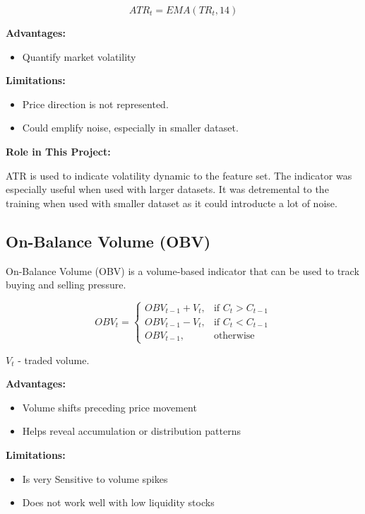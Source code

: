 \begin{equation}
ATR_t = EMA(TR_t, 14)
\end{equation}

\textbf{Advantages:}
\begin{itemize}
    \item Quantify market volatility
\end{itemize}

\textbf{Limitations:}
\begin{itemize}
    \item Price direction is not represented.
    \item Could emplify noise, especially in smaller dataset.
\end{itemize}

\textbf{Role in This Project:}  

ATR is used to indicate volatility dynamic to the feature set. The indicator was especially useful when used with larger datasets. It was detremental to the training when used with smaller dataset as it could introducte a lot of noise.

\subsection{On-Balance Volume (OBV)}

On-Balance Volume (OBV) is a volume-based indicator that can be used to track buying and selling pressure.

\begin{equation}
OBV_t = 
\begin{cases}
OBV_{t-1} + V_t, & \text{if } C_t > C_{t-1} \\
OBV_{t-1} - V_t, & \text{if } C_t < C_{t-1} \\
OBV_{t-1}, & \text{otherwise}
\end{cases}
\end{equation}

$V_t$ - traded volume.

\textbf{Advantages:}
\begin{itemize}
    \item Volume shifts preceding price movement
    \item Helps reveal accumulation or distribution patterns
\end{itemize}

\textbf{Limitations:}
\begin{itemize}
    \item Is very Sensitive to volume spikes
    \item Does not work well with low liquidity stocks
\end{itemize}


